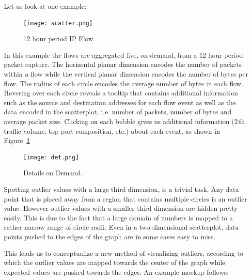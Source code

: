 \documentclass[16pt]{extreport}
\begin{document}
Let us look at one example:
\begin{center}
	\begin{figure}[h]
		\texttt{[image: scatter.png]}
		\caption[]{12 hour period IP Flow}
	\end{figure}
\end{center}

\parbox{\linewidth}{
\justify
\large{In this example the flows are aggregated live, on demand, from a 12 hour period packet capture. The horizontal planar dimension encodes the number of packets within a flow while the vertical planar dimension encodes the number of bytes per flow. The radius of each circle encodes the average number of bytes in each flow. Hovering over each circle reveals a tooltip that contains additional information such as the source and destination addresses for each flow event as well as the data encoded in the scatterplot, i.e. number of packets, number of bytes and average packet size. Clicking on each bubble gives us additional information (24h traffic volume, top port composition, etc.) about each event, as shown in Figure~\ref{fig:det}}}

\begin{center}
	\begin{figure}[h]
		\centering
		\texttt{[image: det.png]}
		\caption[]{Details on Demand.}
		\label{fig:det}
	\end{figure}
\end{center}


\parbox{\linewidth}{
\justify
\large{
Spotting outlier values with a large third dimension, is a trivial task. Any data point that is placed away from a region that contains multiple circles is an outlier value. However outlier values with a smaller third dimension are hidden pretty easily. This is due to the fact that a large domain of numbers is mapped to a rather narrow range of circle radii. Even in a two dimensional scatterplot, data points pushed to the edges of the graph are in some cases easy to miss.}}
\parbox{\linewidth}{
\justify
\large{This leads us to conceptualize a new method of visualizing outliers, according to which the outlier values are mapped towards the center of the graph while expected values are pushed towards the edges. An example mockup follows:}}
\end{document}
